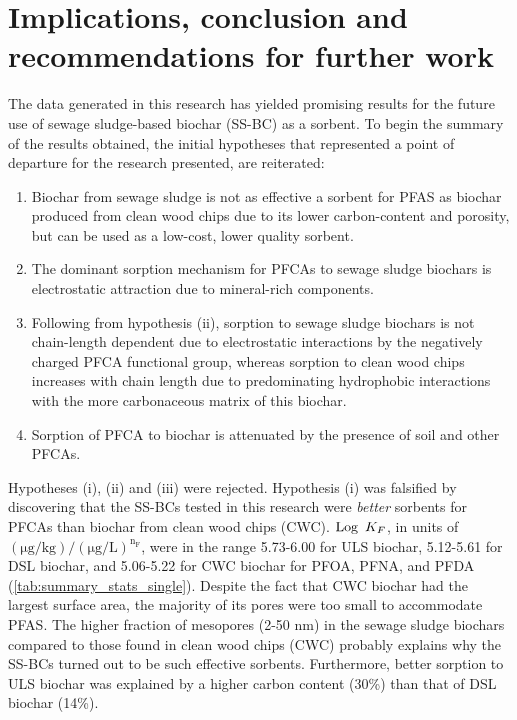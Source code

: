 \chapter{Implications, conclusion and recommendations for further work}\label{chap:Conclusion} 
The data generated in this research has yielded promising results for the future use of sewage sludge-based biochar (SS-BC) as a sorbent. To begin the summary of the results obtained, the initial hypotheses that represented a point of departure for the research presented, are reiterated:

\begin{enumerate}[label=\roman*]
    \item Biochar from sewage sludge is not as effective a sorbent for PFAS as biochar produced from clean wood chips due to its lower carbon-content and porosity, but can be used as a low-cost, lower quality sorbent.
    \item The dominant sorption mechanism for PFCAs to sewage sludge biochars is electrostatic attraction due to mineral-rich components. 
    \item Following from hypothesis (ii), sorption to sewage sludge biochars is not chain-length dependent due to electrostatic interactions by the negatively charged PFCA functional group, whereas sorption to clean wood chips increases with chain length due to predominating hydrophobic interactions with the more carbonaceous matrix of this biochar.
    \item Sorption of PFCA to biochar is attenuated by the presence of soil and other PFCAs. 
\end{enumerate}

Hypotheses (i), (ii) and (iii) were rejected. Hypothesis (i) was falsified by discovering that the SS-BCs tested in this research were \textit{better} sorbents for PFCAs than biochar from clean wood chips (CWC). $\operatorname{Log}~K_F$, in units of $\mathrm{(\mu g/kg)/(\mu g/L)^{n_F}}$, were in the range 5.73-6.00 for ULS biochar, 5.12-5.61 for DSL biochar, and 5.06-5.22 for CWC biochar for PFOA, PFNA, and PFDA (\cref{tab:summary_stats_single}). Despite the fact that CWC biochar had the largest surface area, the majority of its pores were too small to accommodate PFAS. The higher fraction of mesopores (2-50 nm) in the sewage sludge biochars compared to those found in clean wood chips (CWC) probably explains why the SS-BCs turned out to be such effective sorbents. Furthermore, better sorption to ULS biochar was explained by a higher carbon content (30\%) than that of DSL biochar (14\%).

